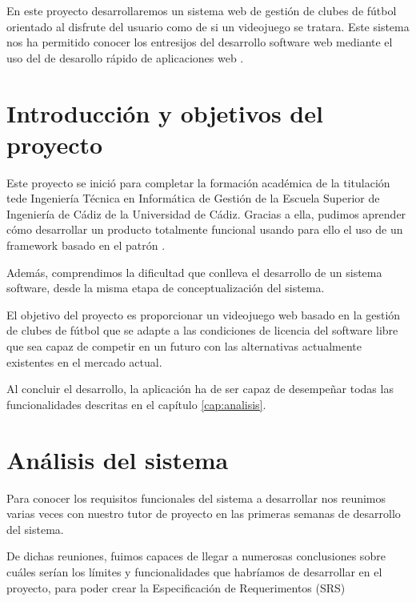 

En este proyecto desarrollaremos un sistema web de gestión de clubes de fútbol orientado al disfrute
del usuario como de si un videojuego se tratara. Este sistema nos ha permitido
conocer los entresijos del desarrollo software web mediante el uso del
 de desarollo rápido de aplicaciones web .

\section{Introducción y objetivos del proyecto}
Este proyecto se inició para completar la formación académica de la titulación
tede Ingeniería Técnica en Informática de Gestión de la Escuela Superior de
Ingeniería de Cádiz de la Universidad de Cádiz. Gracias a ella, pudimos aprender
cómo desarrollar un producto totalmente funcional usando para ello el uso de un
framework basado en el patrón  . 

Además, comprendimos la dificultad que conlleva el desarrollo de un sistema
software, desde la misma etapa de conceptualización del sistema.

El objetivo del proyecto es proporcionar un videojuego web basado en la gestión
de clubes de fútbol que se adapte a las condiciones de licencia del software
libre que sea capaz de competir en un futuro con las alternativas actualmente
existentes en el mercado actual.

Al concluir el desarrollo, la aplicación ha de ser capaz de desempeñar todas las
funcionalidades descritas en el capítulo \ref{cap:analisis}.

\section{Análisis del sistema}
Para conocer los requisitos funcionales del sistema a desarrollar nos reunimos
varias veces con nuestro tutor de proyecto en las primeras semanas de desarrollo
del sistema.

De dichas reuniones, fuimos capaces de llegar a numerosas conclusiones sobre
cuáles serían los límites y funcionalidades que habríamos de desarrollar en el
proyecto, para poder crear la Especificación de Requerimentos (SRS)
\cite{doc:requisitos}

